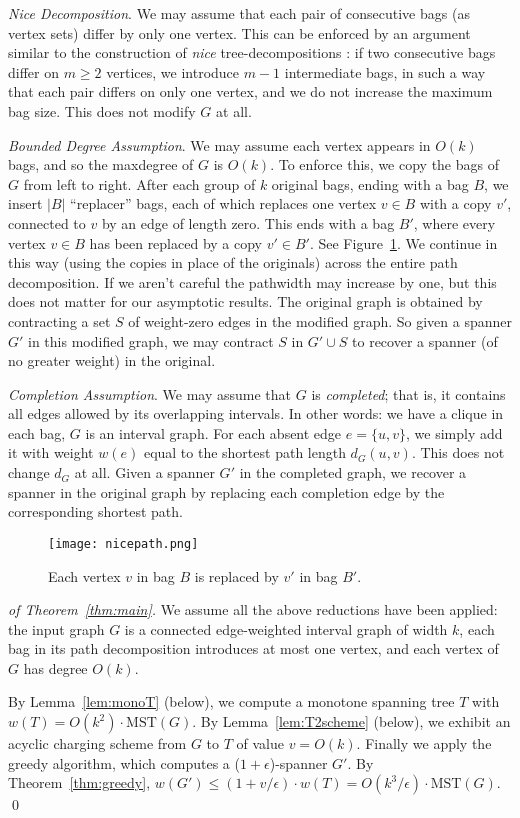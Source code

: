 \documentclass{llncs}
\def\MST{\mbox{MST}}\def\OPT{\mbox{OPT}}\def\Left{\mbox{left}}\def\In#1{\mbox{in$(#1)$}} \def\Out#1{\mbox{out$(#1)$}} \def\Net#1{\mbox{net$(#1)$}} \def\xeP{x_{(e,P)}}
\begin{document}
\emph{Nice Decomposition}. We may assume that each pair of consecutive bags (as vertex
sets) differ by only one vertex.  This can be enforced by an argument
similar to the construction of \emph{nice} tree-decompositions
\cite{DBLP:books/sp/Kloks94}: if two consecutive bags differ on $m\geq
2$ vertices, we introduce $m-1$ intermediate bags, in such a way that
each pair differs on only one vertex, and we do not increase the
maximum bag size. This does not modify $G$ at all.

\emph{Bounded Degree Assumption}. We may assume each vertex appears in $O(k)$ bags, and so the
maxdegree of $G$ is $O(k)$.  To enforce this, we copy the bags of $G$
from left to right.  After each group of $k$ original bags, ending
with a bag $B$, we insert $|B|$ ``replacer'' bags, each of which
replaces one vertex $v\in B$ with a copy $v'$, connected to $v$
by an edge of length zero. This ends with a bag $B'$, where every
vertex $v \in B$ has been replaced by a copy $v'\in B'$.
See Figure~\ref{fig:nicepath}.
We continue in this way (using the copies in place of the originals)
across the entire path decomposition.  If we aren't careful the
pathwidth may increase by one, but this does not matter for our
asymptotic results.  The original graph is obtained by contracting a
set $S$ of weight-zero edges in the modified graph.  So given a
spanner $G'$ in this modified graph, we may contract $S$ in $G'\cup S$
to recover a spanner (of no greater weight) in the original.

\emph{Completion Assumption}. We may assume that $G$ is \emph{completed}; that is, it contains
all edges allowed by its overlapping intervals.  In other words: we
have a clique in each bag, $G$ is an interval graph.  For each absent
edge $e=\{u,v\}$, we simply add it with weight $w(e)$ equal to the
shortest path length $d_G(u,v)$.  This does not change $d_G$ at all.
Given a spanner $G'$ in the completed graph, we recover a spanner in
the original graph by replacing each completion edge by the
corresponding shortest path.

\begin{figure}[ht]
\begin{center}
{\texttt{[image: nicepath.png]}}
\caption{Each vertex $v$ in bag $B$ is replaced by $v'$ in bag $B'$.}
\label{fig:nicepath}
\end{center}
\end{figure}


\begin{proof}[of Theorem~\ref{thm:main}]
We assume all the above reductions have been applied: the input graph $G$
is a connected edge-weighted interval graph of width $k$, each bag in its path 
decomposition introduces at most one vertex, and each vertex of $G$ 
has degree $O(k)$.

By Lemma~\ref{lem:monoT} (below), we compute a monotone spanning tree
$T$ with $w(T)=O(k^2)\cdot \MST(G)$.
By Lemma~\ref{lem:T2scheme} (below), we exhibit an acyclic charging
scheme from $G$ to $T$ of value $v=O(k)$.
Finally we apply the greedy algorithm, which computes
a ($1+\epsilon$)-spanner $G'$.
By Theorem~\ref{thm:greedy}, $w(G') \leq (1+v/\epsilon)\cdot w(T) =
O(k^3/\epsilon)\cdot \MST(G)$.
\qed
\end{proof}
\end{document}
